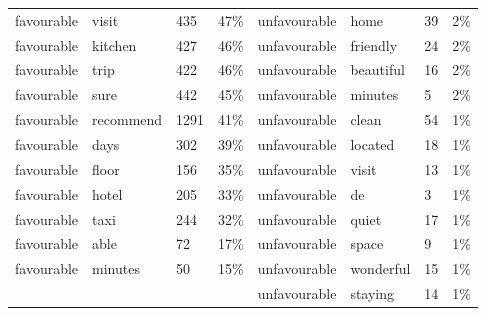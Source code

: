 \documentclass[a4paper, 12pt]{article}
\begin{document}
\begin{longtable}[l]{p{2cm}p{2cm}p{1cm}p{1.6cm}p{2.4cm}p{1.9cm}p{1cm}p{2cm}}
favourable & visit & 435 & 47\% & unfavourable & home & 39 & 2\% \\
favourable & kitchen & 427 & 46\% & unfavourable & friendly & 24 & 2\% \\
favourable & trip & 422 & 46\% & unfavourable & beautiful & 16 & 2\% \\
favourable & sure & 442 & 45\% & unfavourable & minutes & 5 & 2\% \\
favourable & recommend & 1291 & 41\% & unfavourable & clean & 54 & 1\% \\
favourable & days & 302 & 39\% & unfavourable & located & 18 & 1\% \\
favourable & floor & 156 & 35\% & unfavourable & visit & 13 & 1\% \\
favourable & hotel & 205 & 33\% & unfavourable & de & 3 & 1\% \\
favourable & taxi & 244 & 32\% & unfavourable & quiet & 17 & 1\% \\
favourable & able & 72 & 17\% & unfavourable & space & 9 & 1\% \\
favourable & minutes & 50 & 15\% & unfavourable & wonderful & 15 & 1\% \\
 &  &  &  & unfavourable & staying & 14 & 1\% \\
\hline
\end{longtable}
\normalsize



	     
                    
\end{document}
